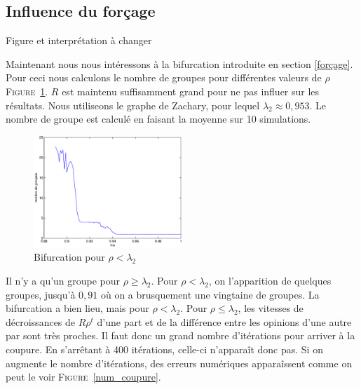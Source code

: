 \documentclass[12pt]{article}
\newcommand{\fig}[1]{\textsc{Figure}~\ref{#1}}
\begin{document}


\subsection{Influence du forçage}
Figure et interprétation à changer

Maintenant nous nous intéressons à la bifurcation introduite en
section \ref{forçage}.  Pour ceci nous calculons le nombre de groupes
pour différentes valeurs de $\rho$ \fig{bifu_map}. $R$ est maintenu
suffisamment grand pour ne pas influer sur les résultats.  Nous
utiliseons le graphe de Zachary, pour lequel $\lambda_2 \approx
0,953$.  Le nombre de groupe est calculé en faisant la moyenne sur 10
simulations.

\begin{figure}[htb]
	\begin{center}
		\includegraphics[width=0.5\textwidth]{bifur}
		\caption{Bifurcation pour $\rho < \lambda_2$}
		\label{bifu_map}
	\end{center}
\end{figure}

Il n'y a qu'un groupe pour $\rho \geq \lambda_2$. Pour $\rho < \lambda_2$, on l'apparition de quelques groupes, jusqu'à $0,91$ où
on a brusquement une vingtaine de groupes. La bifurcation a bien lieu, mais pour $\rho < \lambda_2$. Pour $\rho \leq \lambda_2$, les
vitesses de décroissances de $R\rho^t$ d'une part et de la différence entre les opinions d'une autre par sont très proches. Il
faut donc un grand nombre d'itérations pour arriver à la coupure. En s'arrêtant à 400 itérations, celle-ci n'apparaît donc pas.
Si on augmente le nombre d'itérations, des erreurs numériques apparaîssent comme on peut le voir \fig{num_coupure}.
\end{document}
